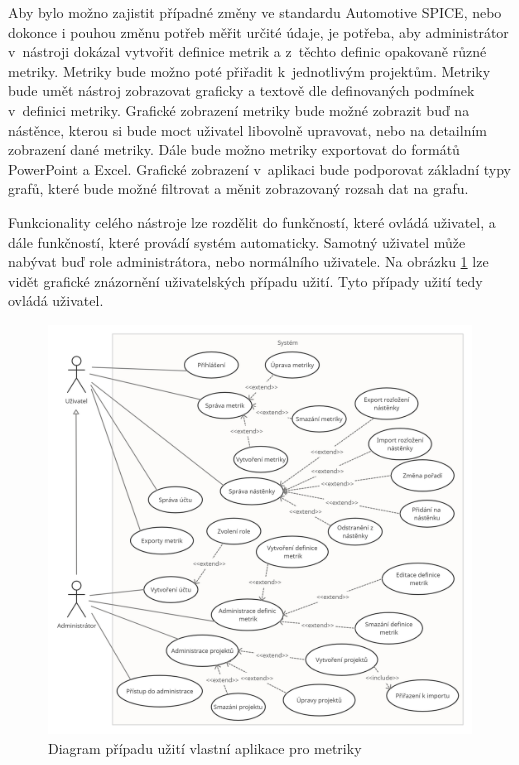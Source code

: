 \documentclass[czech,master]{diploma}
\begin{document}
Aby bylo možno zajistit případné změny ve standardu Automotive SPICE, nebo dokonce i pouhou změnu potřeb měřit určité údaje, je potřeba, aby administrátor v~nástroji dokázal vytvořit definice metrik a z~těchto definic opakovaně různé metriky. Metriky bude možno poté přiřadit k~jednotlivým projektům. Metriky bude umět nástroj zobrazovat graficky a textově dle definovaných podmínek v~definici metriky. Grafické zobrazení metriky bude možné zobrazit buď na nástěnce, kterou si bude moct uživatel libovolně upravovat, nebo na detailním zobrazení dané metriky. Dále bude možno metriky exportovat do formátů PowerPoint a Excel. Grafické zobrazení v~aplikaci bude podporovat základní typy grafů, které bude možné filtrovat a měnit zobrazovaný rozsah dat na grafu.

Funkcionality celého nástroje lze rozdělit do funkčností, které ovládá uživatel, a dále funkčností, které provádí systém automaticky. Samotný uživatel může nabývat buď role administrátora, nebo normálního uživatele. Na obrázku \ref{fig:jazz_metrics_use_case} lze vidět grafické znázornění uživatelských případu užití. Tyto případy užití tedy ovládá uživatel.

\begin{figure}[!ht]
    \centering
    \includegraphics[width=1\textwidth]{Diplomka/Figures/use_case_jazz.png}
    \caption{Diagram případu užití vlastní aplikace pro metriky}
    \label{fig:jazz_metrics_use_case}
\end{figure}
\end{document}
